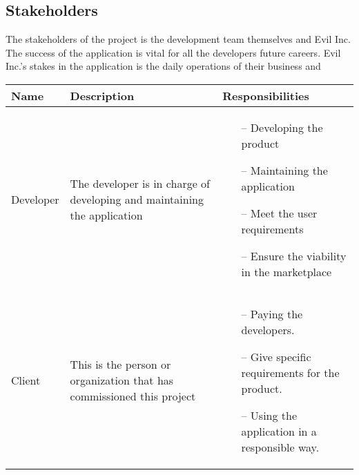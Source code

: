 \documentclass{article}
\begin{document}
\subsection{Stakeholders}
The stakeholders of the project is the development team themselves and Evil Inc. The success of the application is vital for all the developers future careers. Evil Inc.'s stakes in the application is the daily operations of their business and   \vspace{0.2in} \newline
\begin{tabularx}{1.0\textwidth} { 
  | >{\raggedright\arraybackslash}X 
  | >{\raggedright\arraybackslash}X
  | >{\raggedright\arraybackslash}X | }
    \hline
    \rowcolor{lightgray} Name & Description & Responsibilities \\
    \hline
    Developer & The developer is in charge of developing and maintaining the application &
    \begin{itemize}
        \item[--] Developing the product
        \item[--] Maintaining the application 
        \item[--] Meet the user requirements
        \item[--] Ensure the viability in the marketplace
    \end{itemize}{} \\
    \hline
     Client & This is the person or organization that has commissioned this project &
    \begin{itemize}
        \item[--]  Paying the developers.
        \item[--]  Give specific requirements for the product.
        \item[--]  Using the application in a responsible way.
    \end{itemize}{} \\
    \hline

\end{tabularx}
\end{document}
